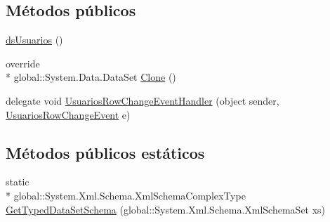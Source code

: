 \subsection*{Métodos públicos}
\begin{DoxyCompactItemize}
\item 
\hyperlink{class_proyecto___integrador__3_1_1ds_usuarios_a74b500ded4355addab6e2a2190a26775}{ds\-Usuarios} ()
\item 
override \\*
global\-::\-System.\-Data.\-Data\-Set \hyperlink{class_proyecto___integrador__3_1_1ds_usuarios_a76ef59d7c92fca1a02c2b9f053dc43bb}{Clone} ()
\item 
delegate void \hyperlink{class_proyecto___integrador__3_1_1ds_usuarios_a571e2cc717092f4996c9c805a464415b}{Usuarios\-Row\-Change\-Event\-Handler} (object sender, \hyperlink{class_proyecto___integrador__3_1_1ds_usuarios_1_1_usuarios_row_change_event}{Usuarios\-Row\-Change\-Event} e)
\end{DoxyCompactItemize}
\subsection*{Métodos públicos estáticos}
\begin{DoxyCompactItemize}
\item 
static \\*
global\-::\-System.\-Xml.\-Schema.\-Xml\-Schema\-Complex\-Type \hyperlink{class_proyecto___integrador__3_1_1ds_usuarios_a8146763ee935baa8f1f578b9b35561e1}{Get\-Typed\-Data\-Set\-Schema} (global\-::\-System.\-Xml.\-Schema.\-Xml\-Schema\-Set xs)
\end{DoxyCompactItemize}
